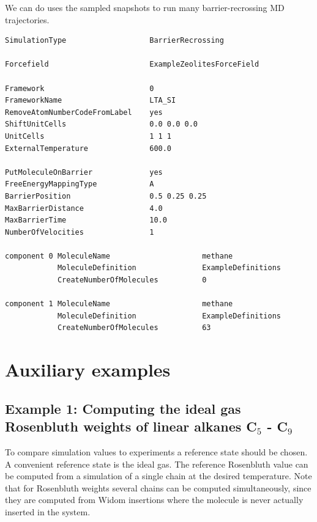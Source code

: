 We can do uses the sampled snapshots to run many barrier-recrossing MD trajectories.
\begin{small}
\begin{verbatim}
SimulationType                   BarrierRecrossing

Forcefield                       ExampleZeolitesForceField

Framework                        0
FrameworkName                    LTA_SI
RemoveAtomNumberCodeFromLabel    yes
ShiftUnitCells                   0.0 0.0 0.0
UnitCells                        1 1 1
ExternalTemperature              600.0

PutMoleculeOnBarrier             yes
FreeEnergyMappingType            A
BarrierPosition                  0.5 0.25 0.25
MaxBarrierDistance               4.0
MaxBarrierTime                   10.0
NumberOfVelocities               1

component 0 MoleculeName                     methane
            MoleculeDefinition               ExampleDefinitions
            CreateNumberOfMolecules          0

component 1 MoleculeName                     methane
            MoleculeDefinition               ExampleDefinitions
            CreateNumberOfMolecules          63
\end{verbatim}
\end{small}

\section{Auxiliary examples}

\subsection*{Example 1: Computing the ideal gas Rosenbluth weights of linear alkanes C$_5$ - C$_9$}

To compare simulation values to experiments a reference state should be chosen. A convenient reference state
is the ideal gas. The reference Rosenbluth value can be computed from a simulation of a single chain at the
desired temperature. Note that for Rosenbluth weights several chains can be computed simultaneously, since
they are computed from Widom insertions where the molecule is never actually inserted in the system.

